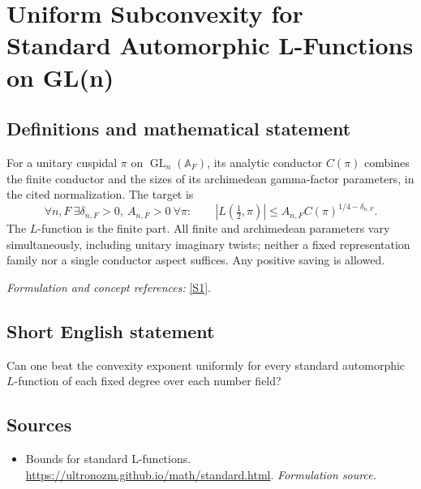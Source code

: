 \documentclass[11pt]{article}
\begin{document}
\section*{\texorpdfstring{Uniform Subconvexity for Standard Automorphic L-Functions on GL(n)}{Uniform Subconvexity for Standard Automorphic L-Functions on GL(n)}}\label{statement}
\subsection{Definitions and mathematical statement}
For a unitary cuspidal $\pi$ on $\operatorname{GL}_n({\mathbb{A}}_F)$, its analytic conductor $C(\pi)$ combines the finite conductor and the sizes of its archimedean gamma-factor parameters, in the cited normalization. The target is
\[
 \forall n,F\ \exists\delta_{n,F}>0,\ A_{n,F}>0\ \forall\pi:\qquad
 |L(\tfrac12,\pi)|\le A_{n,F}C(\pi)^{1/4-\delta_{n,F}}.
\]
The $L$-function is the finite part. All finite and archimedean parameters vary simultaneously, including unitary imaginary twists; neither a fixed representation family nor a single conductor aspect suffices. Any positive saving is allowed.
\par\smallskip\textit{Formulation and concept references:} \href{https://ultronozm.github.io/math/standard.html}{[S1]}.

\subsection{Short English statement}
Can one beat the convexity exponent uniformly for every standard automorphic $L$-function of each fixed degree over each number field?
\subsection{Sources}
\begin{itemize}
\item[S1]Bounds for standard L-functions.
\url{https://ultronozm.github.io/math/standard.html}.
\textit{Formulation source.}
\end{itemize}
\end{document}
